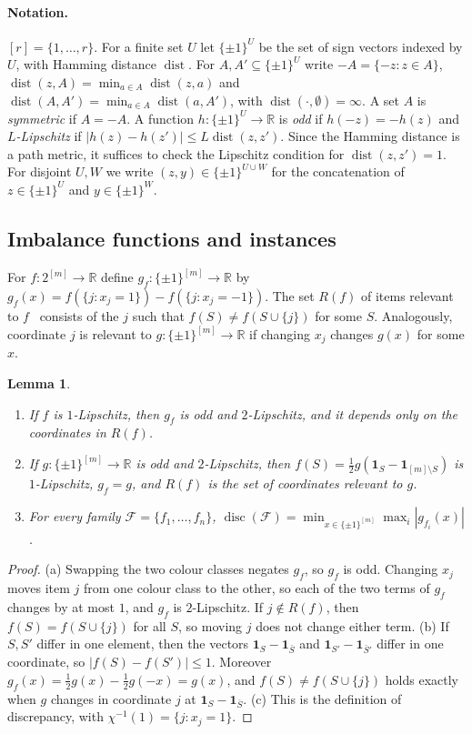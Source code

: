 \documentclass[11pt,letterpaper]{article}
\newtheorem{lemma}[theorem]{Lemma}
\theoremstyle{definition}
\newcommand{\R}{\mathbb{R}}
\newcommand{\cF}{\mathcal{F}}
\newcommand{\cube}[1]{\{\pm1\}^{#1}}
\DeclareMathOperator{\disc}{disc}
\DeclareMathOperator{\dist}{dist}
\begin{document}
\paragraph{Notation.}
$[r]=\{1,\dots,r\}$. For a finite set $U$ let $\cube{U}$ be the set of sign vectors indexed by
$U$, with Hamming distance $\dist$. For $A,A'\subseteq\cube{U}$ write $-A=\{-z:z\in A\}$,
$\dist(z,A)=\min_{a\in A}\dist(z,a)$ and $\dist(A,A')=\min_{a\in A}\dist(a,A')$, with
$\dist(\cdot,\emptyset)=\infty$. A set $A$ is \emph{symmetric} if $A=-A$. A function
$h\colon\cube{U}\to\R$ is \emph{odd} if $h(-z)=-h(z)$ and \emph{$L$-Lipschitz} if
$|h(z)-h(z')|\le L\dist(z,z')$. Since the Hamming distance is a path metric, it suffices to check
the Lipschitz condition for $\dist(z,z')=1$. For disjoint $U,W$ we write $(z,y)\in\cube{U\cup W}$
for the concatenation of $z\in\cube U$ and $y\in\cube W$.

\subsection{Imbalance functions and instances}

For $f\colon2^{[m]}\to\R$ define $g_f\colon\cube{[m]}\to\R$ by
$g_f(x)=f(\{j:x_j=1\})-f(\{j:x_j=-1\})$. The set $R(f)$ of items relevant to
$f$~\cite[Definition~13]{HMMS25} consists of the $j$ such that $f(S)\ne f(S\cup\{j\})$ for some
$S$. Analogously, coordinate $j$ is relevant to $g\colon\cube{[m]}\to\R$ if changing $x_j$ changes
$g(x)$ for some $x$.

\begin{lemma}\label{lem:imbalance}
\begin{enumerate}[label=(\alph*),itemsep=0pt]
\item If $f$ is $1$-Lipschitz, then $g_f$ is odd and $2$-Lipschitz, and it depends only on the
coordinates in $R(f)$.
\item If $g\colon\cube{[m]}\to\R$ is odd and $2$-Lipschitz, then
$f(S)=\tfrac12g(\mathbf 1_S-\mathbf 1_{[m]\setminus S})$ is $1$-Lipschitz, $g_f=g$, and $R(f)$ is
the set of coordinates relevant to $g$.
\item For every family $\cF=\{f_1,\dots,f_n\}$,
$\disc(\cF)=\min_{x\in\cube{[m]}}\max_i|g_{f_i}(x)|$.
\end{enumerate}
\end{lemma}

\begin{proof}
(a) Swapping the two colour classes negates $g_f$, so $g_f$ is odd. Changing $x_j$ moves item $j$
from one colour class to the other, so each of the two terms of $g_f$ changes by at most $1$, and
$g_f$ is $2$-Lipschitz. If $j\notin R(f)$, then $f(S)=f(S\cup\{j\})$ for all $S$, so moving $j$
does not change either term.
(b) If $S,S'$ differ in one element, then the vectors $\mathbf 1_S-\mathbf 1_{\bar S}$ and
$\mathbf 1_{S'}-\mathbf 1_{\bar S'}$ differ in one coordinate, so $|f(S)-f(S')|\le1$. Moreover
$g_f(x)=\frac12g(x)-\frac12g(-x)=g(x)$, and $f(S)\ne f(S\cup\{j\})$ holds exactly when $g$ changes
in coordinate $j$ at $\mathbf 1_S-\mathbf 1_{\bar S}$.
(c) This is the definition of discrepancy, with $\chi^{-1}(1)=\{j:x_j=1\}$.
\end{proof}
\end{document}
